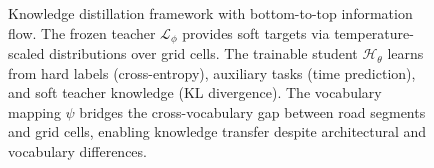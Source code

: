 \begin{figure}[t]
\begin{tikzpicture}
    \end{tikzpicture}
    \caption{Knowledge distillation framework with bottom-to-top information flow. The frozen teacher $\mathcal{L}_\phi$ provides soft targets via temperature-scaled distributions over grid cells. The trainable student $\mathcal{H}_\theta$ learns from hard labels (cross-entropy), auxiliary tasks (time prediction), and soft teacher knowledge (KL divergence). The vocabulary mapping $\psi$ bridges the cross-vocabulary gap between road segments and grid cells, enabling knowledge transfer despite architectural and vocabulary differences.}
    \label{fig:distillation-framework}
\end{figure}

